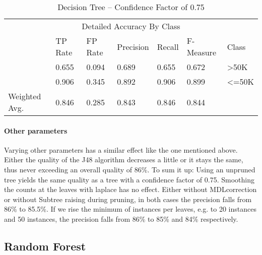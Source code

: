 \documentclass[paper=a4, fontsize=11pt]{scrartcl} %
\numberwithin{equation}{section} %
\numberwithin{figure}{section} %
\numberwithin{table}{section} %
\begin{document}
\begin{table*}[htb]\centering
    \begin{tabular*}{\columnwidth}{@{}lllllll@{}}
        \toprule 
        \multicolumn{7}{c}{Detailed Accuracy By Class} \\ 
              &  TP Rate & FP Rate & Precision & Recall &  F-Measure &  Class  \\ \midrule        
              &  0.655   & 0.094   & 0.689     & 0.655  &  0.672     &  >50K   \\          
              &  0.906   & 0.345   & 0.892     & 0.906  &  0.899     &  <=50K  \\          
Weighted Avg. &  0.846   & 0.285   & 0.843     & 0.846  &  0.844     &         \\ \bottomrule          
    \end{tabular*}
\caption{Decision Tree -- Confidence Factor of 0.75} 
\label{tab:adult:dec:cf75}
\end{table*}
\FloatBarrier

\paragraph{Other parameters}
Varying other parameters has a similar effect like the one mentioned above. Either the quality of the J48 algorithm decreases a little or it stays the same, thus never exceeding an overall quality of 86\%. To sum it up: Using an unpruned tree yields the same quality as a tree with a confidence factor of 0.75. Smoothing the counts at the leaves with laplace has no effect. Either without MDLcorrection or without Subtree raising during pruning, in both cases the precision falls from 86\% to 85.5\%. If we rise the minimum of instances per leaves, e.g. to 20 instances and 50 instances, the precision falls from 86\% to 85\% and 84\% respectively.



\subsection{Random Forest}
\end{document}
